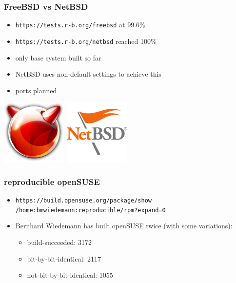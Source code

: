 \documentclass[14pt,aspectratio=169]{beamer}
\begin{document}
\begin{frame}
 \frametitle{FreeBSD vs NetBSD}
 \begin{itemize}
  \item \texttt{https://tests.r-b.org/freebsd} at 99.6\%
  \item \texttt{https://tests.r-b.org/netbsd} reached 100\%
  \item<2> only base system built so far
  \item<2> NetBSD uses non-default settings to achieve this
  \item<2> ports planned
 \end{itemize}
 \begin{center}
  \includegraphics[height=0.13\paperheight]{images/freebsd.png}
  \hspace{0.05\paperwidth}
  \includegraphics[height=0.13\paperheight]{images/netbsd.png}
\end{center}
\end{frame}


\begin{frame}
 \frametitle{reproducible openSUSE}
 \begin{itemize}
  \item
  \small{\texttt{https://build.opensuse.org/package/show \\
  /home:bmwiedemann:reproducible/rpm?expand=0}}
  \item Bernhard Wiedemann has built openSUSE twice (with some variations):
  \begin{itemize}
   \item build-succeeded: 3172
   \item bit-by-bit-identical: 2117
   \item not-bit-by-bit-identical: 1055
 \end{itemize}
 \end{itemize}
\end{frame}
\end{document}
